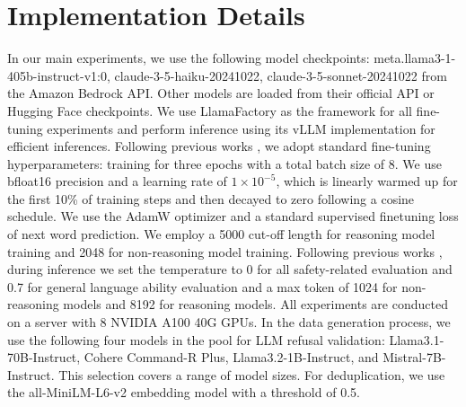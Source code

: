 \documentclass{article} %
\begin{document}
\section{Implementation Details}
\label{sec: implement}
In our main experiments, we use the following model checkpoints: meta.llama3-1-405b-instruct-v1:0, claude-3-5-haiku-20241022, claude-3-5-sonnet-20241022 from the Amazon Bedrock API. Other models are loaded from their official API or Hugging Face checkpoints. We use LlamaFactory \citep{zheng-etal-2024-llamafactory} as the framework for all fine-tuning experiments and perform inference using its vLLM \citep{kwon2023efficient} implementation for efficient inferences. Following previous works \citep{brahman2024art, muennighoff2025s1}, we adopt standard fine-tuning hyperparameters: training for three epochs with a total batch size of 8. We use bfloat16 precision and a learning rate of $1 \times 10^{-5}$, which is linearly warmed up for the first 10\% of training steps and then decayed to zero following a cosine schedule. We use the AdamW \citep{loshchilov2017decoupled} optimizer and a standard supervised finetuning loss of next word prediction. We employ a 5000 cut-off length for reasoning model training and 2048 for non-reasoning model training. Following previous works \citep{rottger-etal-2024-xstest, cui2024or}, during inference we set the temperature to 0 for all safety-related evaluation and 0.7 for general language ability evaluation \citep{xie2024sorry} and a max token of 1024 for non-reasoning models and 8192 for reasoning models. All experiments are conducted on a server with 8 NVIDIA A100 40G GPUs. In the data generation process, we use the following four models in the pool for LLM refusal validation: Llama3.1-70B-Instruct, Cohere Command-R Plus, Llama3.2-1B-Instruct, and Mistral-7B-Instruct. This selection covers a range of model sizes. For deduplication, we use the all-MiniLM-L6-v2 \citep{wang2020minilm} embedding model with a threshold of 0.5.
\end{document}
